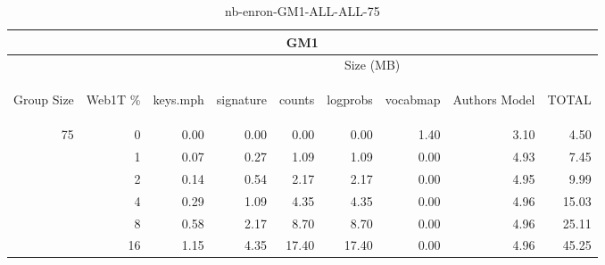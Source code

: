 \begin{center}
\begin{table}[htbp] 
 \begin{center}
\begin{tabular}{ | r | r | r | r | r | r | r | r | r |}
\hline
\multicolumn{9}{|c|}{GM1}\\
\hline
 & & \multicolumn{7}{|c|}{Size (MB)}\\ \cline{3-9}
\begin{sideways}Group Size\end{sideways} & \begin{sideways}Web1T \% \end{sideways} & \begin{sideways}keys.mph\end{sideways} & \begin{sideways}signature\end{sideways} & \begin{sideways}counts\end{sideways} & \begin{sideways}logprobs\end{sideways} & \begin{sideways}vocabmap\end{sideways} & \begin{sideways}Authors Model \end{sideways} & \begin{sideways}TOTAL\end{sideways}\\
\hline
\multirow{5}{*}{75}
 & 0 & 0.00 & 0.00 & 0.00 & 0.00 & 1.40 & 3.10 & 4.50\\ \cline{2-9}
 & 1 & 0.07 & 0.27 & 1.09 & 1.09 & 0.00 & 4.93 & 7.45\\ \cline{2-9}
 & 2 & 0.14 & 0.54 & 2.17 & 2.17 & 0.00 & 4.95 & 9.99\\ \cline{2-9}
 & 4 & 0.29 & 1.09 & 4.35 & 4.35 & 0.00 & 4.96 & 15.03\\ \cline{2-9}
 & 8 & 0.58 & 2.17 & 8.70 & 8.70 & 0.00 & 4.96 & 25.11\\ \cline{2-9}
 & 16 & 1.15 & 4.35 & 17.40 & 17.40 & 0.00 & 4.96 & 45.25\\ \cline{2-9}
\hline
\end{tabular}
\caption{nb-enron-GM1-ALL-ALL-75}
\label{table:nb-enron-GM1-ALL-ALL-75}
\end{center}
 \end{table}
\end{center}

